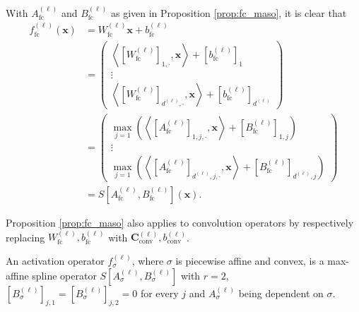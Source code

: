 \begin{tproof}
    With $A^{(\ell)}_{\text{fc}}$ and $B^{(\ell)}_{\text{fc}}$ as given in Proposition \ref{prop:fc_maso}, it is clear that 
    \begin{align*}
        f^{(\ell)}_{\text{fc}}(\mathbf{x})&=W_{\text{fc}}^{(\ell)}\mathbf{x}+b^{(\ell)}_{\text{fc}}\\&=\begin{pmatrix}\left\langle\left[W^{(\ell)}_{\text{fc}}\right]_{1,\cdot},\mathbf{x}\right\rangle+\left[b^{(\ell)}_{\text{fc}}\right]_1\\\vdots\\\left\langle\left[W^{(\ell)}_{\text{fc}}\right]_{d^{(\ell)},\cdot},\mathbf{x}\right\rangle+\left[b^{(\ell)}_{\text{fc}}\right]_{d^{(\ell)}}\end{pmatrix}\\&=\begin{pmatrix}\max_{j=1}\left(\left\langle\left[A^{(\ell)}_{\text{fc}}\right]_{1,j,\cdot},\mathbf{x}\right\rangle+\left[B^{(\ell)}_{\text{fc}}\right]_{1,j}\right)\\\vdots\\\max_{j=1}\left(\left\langle\left[A^{(\ell)}_{\text{fc}}\right]_{d^{(\ell)},j,\cdot},\mathbf{x}\right\rangle+\left[B^{(\ell)}_{\text{fc}}\right]_{d^{(\ell)},j}\right)\end{pmatrix}\\&=S\left[A^{(\ell)}_{\text{fc}},B^{(\ell)}_{\text{fc}}\right](\mathbf{x}).
    \end{align*}
\end{tproof}

\begin{remark}
    Proposition \ref{prop:fc_maso} also applies to convolution operators by respectively replacing $W_{\text{fc}}^{(\ell)}, b_{\text{fc}}^{(\ell)}$ with $\mathbf{C}_{\text{conv}}^{(\ell)}, b_{\text{conv}}^{(\ell)}$.
\end{remark}

\begin{proposition}
    An activation operator $f_{\sigma}^{(\ell)}$, where $\sigma$ is piecewise affine and convex, is a max-affine spline operator $S\left[A_{\sigma}^{(\ell)},B_{\sigma}^{(\ell)}\right]$ with $r=2$, $\left[B_{\sigma}^{(\ell)}\right]_{j,1}=\left[B_{\sigma}^{(\ell)}\right]_{j,2}=0$ for every $j$ and $A_{\sigma}^{(\ell)}$ being dependent on $\sigma$.
\end{proposition}

